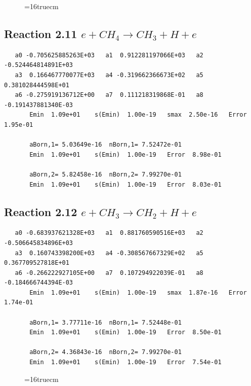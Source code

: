 \documentclass[12pt,dvipdfmx]{article}
\begin{document}
\begin{figure} \label{met.1_2.10}
\epsfxsize=16truecm
\end{figure}
\newpage

\subsection{
Reaction 2.11      $e + CH_4 \rightarrow CH_3 + H + e $
}

\begin{small}\begin{verbatim}
   a0 -0.705625885263E+03   a1  0.912281197066E+03   a2 -0.524464814891E+03
   a3  0.166467770077E+03   a4 -0.319662366673E+02   a5  0.381028444598E+01
   a6 -0.275919136712E+00   a7  0.111218319868E-01   a8 -0.191437881340E-03
       Emin  1.09e+01    s(Emin)  1.00e-19   smax  2.50e-16   Error  1.95e-01

       aBorn,1= 5.03649e-16  nBorn,1= 7.52472e-01
       Emin  1.09e+01    s(Emin)  1.00e-19   Error  8.98e-01

       aBorn,2= 5.82458e-16  nBorn,2= 7.99270e-01
       Emin  1.09e+01    s(Emin)  1.00e-19   Error  8.03e-01
\end{verbatim}\end{small}

\subsection{
Reaction 2.12      $e + CH_3 \rightarrow CH_2 + H + e $
}

\begin{small}\begin{verbatim}
   a0 -0.683937621328E+03   a1  0.881760590516E+03   a2 -0.506645834896E+03
   a3  0.160743398200E+03   a4 -0.308567667329E+02   a5  0.367709527818E+01
   a6 -0.266222927105E+00   a7  0.107294922039E-01   a8 -0.184666744394E-03
       Emin  1.09e+01    s(Emin)  1.00e-19   smax  1.87e-16   Error  1.74e-01

       aBorn,1= 3.77711e-16  nBorn,1= 7.52448e-01
       Emin  1.09e+01    s(Emin)  1.00e-19   Error  8.50e-01

       aBorn,2= 4.36843e-16  nBorn,2= 7.99270e-01
       Emin  1.09e+01    s(Emin)  1.00e-19   Error  7.54e-01
\end{verbatim}\end{small}

\begin{figure} \label{met.1_2.11}
\epsfxsize=16truecm
\end{figure}
\newpage
\end{document}
